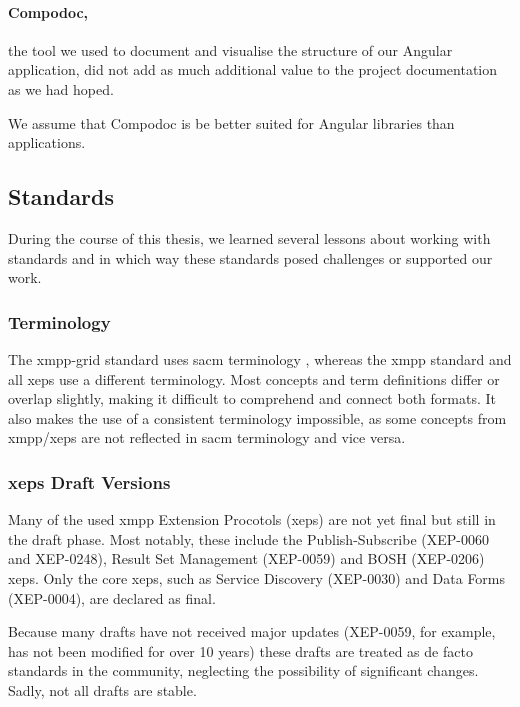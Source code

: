 \paragraph{Compodoc,} the tool we used to document and visualise the structure of our Angular application,
did not add as much additional value to the project documentation as we had hoped.

We assume that Compodoc is be better suited for Angular libraries than applications.

\subsection{Standards}\label{lessons-learned-standards}

During the course of this thesis, we learned several lessons about working with standards and in which way these standards posed challenges or supported our work.

\subsubsection{Terminology}

The \gls{xmpp-grid} standard uses \gls{sacm} terminology \cite{ietf-sacm-terminology-14}, whereas the \gls{xmpp} standard and all \glspl{xep} use a different terminology.
Most concepts and term definitions differ or overlap slightly, making it difficult to comprehend and connect both formats.
It also makes the use of a consistent terminology impossible, as some concepts from \gls{xmpp}/\glspl{xep} are not reflected in \gls{sacm} terminology and vice versa.

\subsubsection{\glspl{xep} Draft Versions}
Many of the used \gls{xmpp} Extension Procotols (\glspl{xep}) are not yet final but still in the draft phase.
Most notably, these include the Publish-Subscribe (XEP-0060 and XEP-0248), Result Set Management (XEP-0059) and BOSH (XEP-0206) \glspl{xep}.
Only the core \glspl{xep}, such as Service Discovery (XEP-0030) and Data Forms (XEP-0004), are declared as final.

Because many drafts have not received major updates (XEP-0059, for example, has not been modified for over 10 years) these drafts are treated as de facto standards in the community, neglecting the possibility of significant changes.
Sadly, not all drafts are stable.

